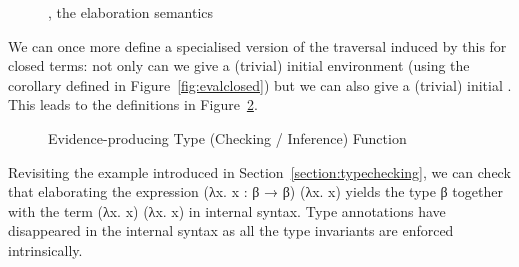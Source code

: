 \begin{figure}[h]
  \caption{, the elaboration semantics\label{defn:Elaborate}}
\end{figure}

We can once more define a specialised version of the traversal induced by this
 for closed terms: not only can we give a (trivial) initial
environment (using the  corollary defined in Figure~\ref{fig:evalclosed})
but we can also give a (trivial) initial . This leads to the
definitions in Figure~\ref{fig:typedelaboration}.

\begin{figure}[h]
\begin{minipage}{0.45\textwidth}
\end{minipage}\hfill
\begin{minipage}{0.45\textwidth}
\end{minipage}
\caption{Evidence-producing Type (Checking / Inference) Function}
\label{fig:typedelaboration}
\end{figure}

Revisiting the example introduced in Section~\ref{section:typechecking},
we can check that elaborating the expression {(λx. x : β → β) (λx. x)}
yields the type {β} together with the term {(λx. x) (λx. x)} in internal
syntax. Type annotations have disappeared in the internal syntax as all
the type invariants are enforced intrinsically.

\begin{figure}[h]
\end{figure}

